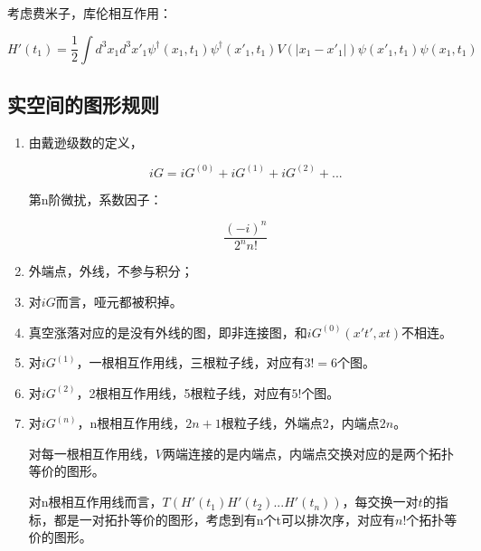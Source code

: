 考虑费米子，库伦相互作用：


\begin{equation}
H'(t_1) = \frac{1}{2} \int d^3 x_1 d^3 x'_1 \psi^\dagger (x_1,t_1 ) \psi^\dagger (x'_1, t_1) V( | x_1-x'_1 |) \psi( x'_1, t_1 ) \psi(x_1, t_1)
\end{equation}

\subsection{实空间的图形规则}

\begin{enumerate}
\item 

由戴逊级数的定义，

\begin{equation*}
iG = iG^{(0)} + iG^{(1)} + iG^{(2)} + ...
\end{equation*}


第n阶微扰，系数因子：

\begin{equation*}
\frac{ (-i)^n  }{ 2^n n!  }
\end{equation*}

\item 

外端点，外线，不参与积分；

\item 

对$iG$而言，哑元都被积掉。

\item

真空涨落对应的是没有外线的图，即非连接图，和$iG^{(0)}(x't',xt)$不相连。

\item

对$i G^{(1)}$，一根相互作用线，三根粒子线，对应有$3! = 6$个图。

\item

对$i G^{(2)}$，2根相互作用线，5根粒子线，对应有$5!$个图。

\item

对$i G^{(n)}$，n根相互作用线，$2n +1$根粒子线，外端点2，内端点$2n$。

对每一根相互作用线，$V$两端连接的是内端点，内端点交换对应的是两个拓扑等价的图形。

对n根相互作用线而言，$T(H'(t_1) H'(t_2) ... H'(t_n))$，每交换一对$t$的指标，都是一对拓扑等价的图形，考虑到有n个t可以排次序，对应有$n!$个拓扑等价的图形。


\end{enumerate}
